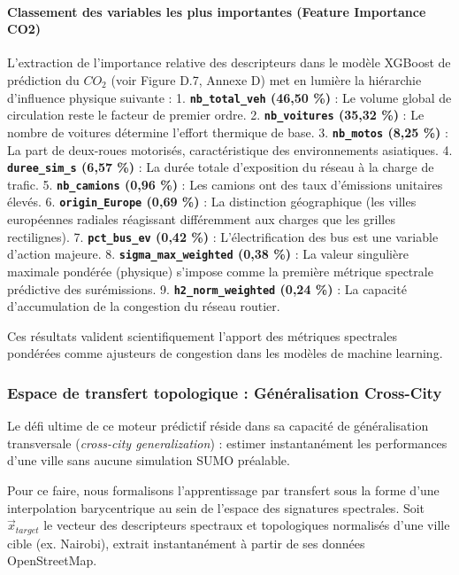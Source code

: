 \documentclass[10pt, a4paper]{article}
\begin{document}
\paragraph{Classement des variables les plus importantes (Feature
Importance
CO2)}\label{classement-des-variables-les-plus-importantes-feature-importance-co2}

L'extraction de l'importance relative des descripteurs dans le modèle
XGBoost de prédiction du \(CO_2\) (voir Figure D.7, Annexe D) met en
lumière la hiérarchie d'influence physique suivante : 1.
\textbf{\texttt{nb\_total\_veh} (46,50 \%)} : Le volume global de
circulation reste le facteur de premier ordre. 2.
\textbf{\texttt{nb\_voitures} (35,32 \%)} : Le nombre de voitures
détermine l'effort thermique de base. 3. \textbf{\texttt{nb\_motos}
(8,25 \%)} : La part de deux-roues motorisés, caractéristique des
environnements asiatiques. 4. \textbf{\texttt{duree\_sim\_s} (6,57 \%)}
: La durée totale d'exposition du réseau à la charge de trafic. 5.
\textbf{\texttt{nb\_camions} (0,96 \%)} : Les camions ont des taux
d'émissions unitaires élevés. 6. \textbf{\texttt{origin\_Europe} (0,69
\%)} : La distinction géographique (les villes européennes radiales
réagissant différemment aux charges que les grilles rectilignes). 7.
\textbf{\texttt{pct\_bus\_ev} (0,42 \%)} : L'électrification des bus est
une variable d'action majeure. 8. \textbf{\texttt{sigma\_max\_weighted}
(0,38 \%)} : La valeur singulière maximale pondérée (physique) s'impose
comme la première métrique spectrale prédictive des surémissions. 9.
\textbf{\texttt{h2\_norm\_weighted} (0,24 \%)} : La capacité
d'accumulation de la congestion du réseau routier.

Ces résultats valident scientifiquement l'apport des métriques
spectrales pondérées comme ajusteurs de congestion dans les modèles de
machine learning.

\subsubsection{Espace de transfert topologique : Généralisation
Cross-City}\label{espace-de-transfert-topologique-guxe9nuxe9ralisation-cross-city}

Le défi ultime de ce moteur prédictif réside dans sa capacité de
généralisation transversale (\emph{cross-city generalization}) : estimer
instantanément les performances d'une ville sans aucune simulation SUMO
préalable.

Pour ce faire, nous formalisons l'apprentissage par transfert sous la
forme d'une interpolation barycentrique au sein de l'espace des
signatures spectrales. Soit \(\vec{x}_{target}\) le vecteur des
descripteurs spectraux et topologiques normalisés d'une ville cible (ex.
Nairobi), extrait instantanément à partir de ses données OpenStreetMap.
\end{document}
